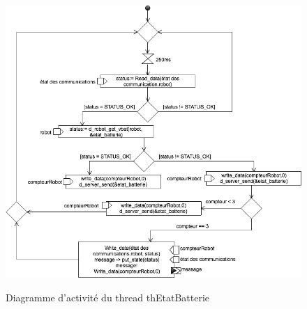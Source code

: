 \documentclass[11pt, a4paper]{paper}
\begin{document}
\begin{figure}[htbp]
\label{fig:act_communiquer}
\begin{center}
{\includegraphics[scale=.4]{./figures/etat_batterie}}
{\caption{Diagramme d'activité du thread thEtatBatterie}}
\end{center}
\end{figure}
\FloatBarrier
\end{document}
